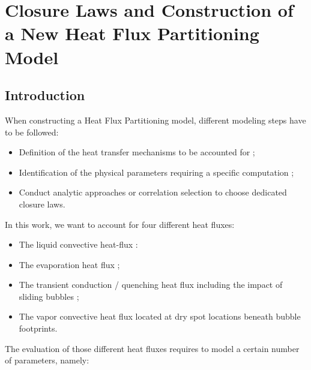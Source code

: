 
\chapter{Closure Laws and Construction of a New Heat Flux Partitioning Model} %

\label{chap:HFP_Assembling} %


\minitoc

\section{Introduction}

When constructing a Heat Flux Partitioning model, different modeling steps have to be followed:

\begin{itemize}
\item Definition of the heat transfer mechanisms to be accounted for ;
\item Identification of the physical parameters requiring a specific computation ;
\item Conduct analytic approaches or correlation selection to choose dedicated closure laws.
\end{itemize}

In this work, we want to account for four different heat fluxes:

\begin{itemize}
\item The liquid convective heat-flux :
\item The evaporation heat flux ;
\item The transient conduction / quenching heat flux including the impact of sliding bubbles ;
\item The vapor convective heat flux located at dry spot locations beneath bubble footprints.
\end{itemize}

The evaluation of those different heat fluxes requires to model a certain number of parameters, namely:

